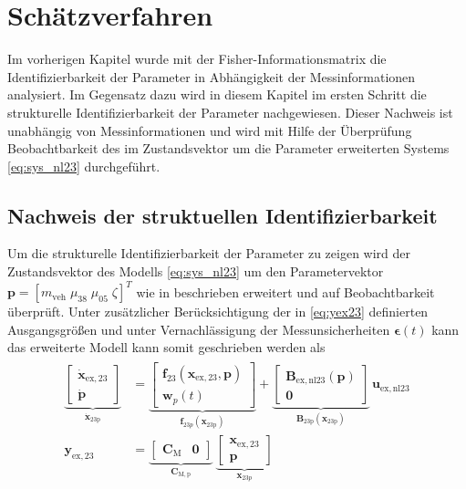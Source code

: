\chapter{Schätzverfahren}\label{ch:ch3}
Im vorherigen Kapitel wurde mit der Fisher-Informationsmatrix die Identifizierbarkeit der Parameter in Abhängigkeit der Messinformationen analysiert. Im Gegensatz dazu wird in diesem Kapitel im ersten Schritt die strukturelle Identifizierbarkeit der Parameter nachgewiesen. Dieser Nachweis ist unabhängig von Messinformationen und wird mit Hilfe der Überprüfung Beobachtbarkeit des im Zustandsvektor um die Parameter erweiterten Systems \eqref{eq:sys_nl23} durchgeführt.

\section{Nachweis der struktuellen Identifizierbarkeit}
Um die strukturelle Identifizierbarkeit der Parameter zu zeigen wird der Zustandsvektor des Modells \eqref{eq:sys_nl23} um den Parametervektor $\pmb{p} = [m_\mathrm{veh}\; \mu_{38}\; \mu_{05}\; \zeta]^T$ wie in \cite[S. 445ff]{Bohn.2016} beschrieben erweitert und auf Beobachtbarkeit überprüft. Unter zusätzlicher Berücksichtigung der in \eqref{eq:yex23} definierten Ausgangsgrößen und unter Vernachlässigung der Messunsicherheiten $\pmb{\epsilon}(t)$ kann das erweiterte Modell kann somit geschrieben werden als
\begin{align}\label{eq:sys_nl23p}
\begin{split}
\underbrace{\begin{bmatrix}\dot{\pmb{x}}_\mathrm{ex,23} \\ \dot{\pmb{p}}\end{bmatrix}}_{\pmb{\dot{x}}_\mathrm{23p}} &= \underbrace{\begin{bmatrix} \pmb{f}_{23}(\pmb{x}_\mathrm{ex,23},\pmb{p}) \\\pmb{w}_p(t) \end{bmatrix}}_{\pmb{f}_{23p}(\pmb{x}_\mathrm{23p})} + \underbrace{\begin{bmatrix} \pmb{B}_\mathrm{ex,nl23}(\pmb{p}) \\ \pmb{0} \end{bmatrix}}_{\pmb{B}_\mathrm{23p}(\pmb{x}_\mathrm{23p})}\, \pmb{u}_\mathrm{ex,nl23}\\
\pmb{y}_\mathrm{ex,23} &= \underbrace{\begin{bmatrix} \pmb{C}_\mathrm{M}& \pmb{0} \end{bmatrix}}_{\pmb{C}_\mathrm{M,p}}\ \underbrace{\begin{bmatrix}\pmb{x}_\mathrm{ex,23} \\ \pmb{p}\end{bmatrix}}_{\pmb{x}_{23p}}
\end{split}
\end{align}
